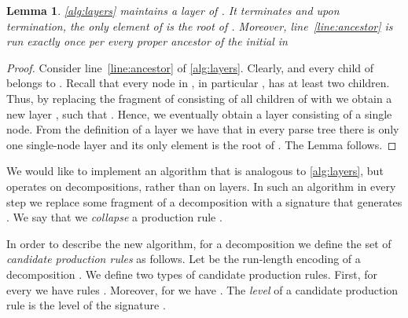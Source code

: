 \documentclass[a4paper]{article}
\newtheorem{lemma}[theorem]{Lemma}
\theoremstyle{remark}
\begin{document}
\begin{lemma}
\cref{alg:layers} maintains a layer  of .
It terminates and upon termination, the only element of  is the root of .
Moreover, line~\ref{line:ancestor} is run exactly once per every proper ancestor of the initial  in 
\end{lemma}

\begin{proof}
Consider line~\ref{line:ancestor} of \cref{alg:layers}.
Clearly,  and every child of  belongs to .
Recall that every node in , in particular , has at least two children.
Thus, by replacing the fragment of  consisting of all children of  with  we obtain a new layer , such that .
Hence, we eventually obtain a layer consisting of a single node.
From the definition of a layer we have that in every parse tree there is only one single-node layer and its only element is the root of .
The Lemma follows.
\end{proof}

We would like to implement an algorithm that is analogous to \cref{alg:layers}, but operates on decompositions, rather than on layers.
In such an algorithm in every step we replace some fragment  of a decomposition  with a signature  that generates .
We say that we \emph{collapse} a production rule .

In order to describe the new algorithm, for a decomposition  we define the set of \emph{candidate production rules} as follows.
Let  be the run-length encoding of a decomposition .
We define two types of candidate production rules.
First, for every  we have rules .
Moreover, for  we have .
The \emph{level} of a candidate production rule  is the level of the signature .
\end{document}
